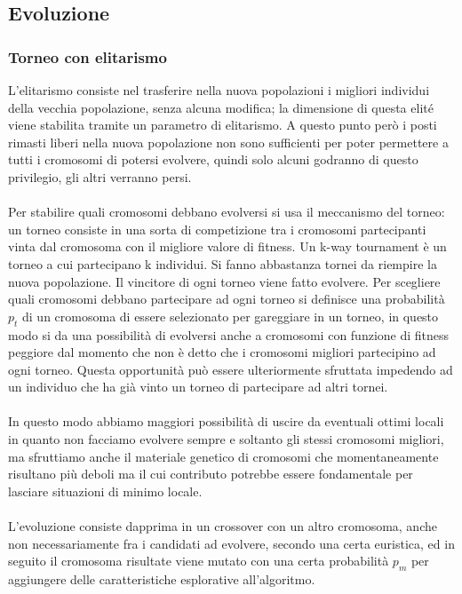 \documentclass{article}
\begin{document}
\subsection{Evoluzione}
\subsubsection{Torneo con elitarismo \cite{Yongsheng} \cite{gfg}}
L'elitarismo consiste nel trasferire nella nuova popolazioni i migliori individui della vecchia popolazione, senza alcuna modifica; la dimensione di questa elité viene stabilita tramite un parametro di elitarismo.
A questo punto però i posti rimasti liberi nella nuova popolazione non sono sufficienti per poter permettere a tutti i cromosomi di potersi evolvere, quindi solo alcuni godranno di questo privilegio, gli altri verranno persi.
\paragraph{}
Per stabilire quali cromosomi debbano evolversi si usa il meccanismo del torneo: un torneo consiste in una sorta di competizione tra i cromosomi partecipanti vinta dal cromosoma con il migliore valore di fitness. Un k-way tournament è un torneo a cui partecipano k individui. Si fanno abbastanza tornei da riempire la nuova popolazione. Il vincitore di ogni torneo viene fatto evolvere.
Per scegliere quali cromosomi debbano partecipare ad ogni torneo si definisce una probabilità $p_t$ di un cromosoma di essere selezionato per gareggiare in un torneo, in questo modo si da una possibilità di evolversi anche a cromosomi con funzione di fitness peggiore dal momento che non è detto che i cromosomi migliori partecipino ad ogni torneo. Questa opportunità può essere ulteriormente sfruttata impedendo ad un individuo che ha già vinto un torneo di partecipare ad altri tornei. 
\paragraph{}
In questo modo abbiamo maggiori possibilità di uscire da eventuali ottimi locali in quanto non facciamo evolvere sempre e soltanto gli stessi cromosomi migliori, ma sfruttiamo anche il materiale genetico di cromosomi che momentaneamente risultano più deboli ma il cui contributo potrebbe essere fondamentale per lasciare situazioni di minimo locale.

\paragraph{}
L'evoluzione consiste dapprima in un crossover con un altro cromosoma, anche non necessariamente fra i candidati ad evolvere, secondo una certa euristica, ed in seguito il cromosoma risultate viene mutato con una certa probabilità $p_m$ per aggiungere delle caratteristiche esplorative all'algoritmo.
\end{document}
